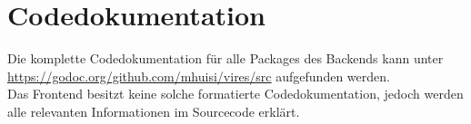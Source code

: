 \section{Codedokumentation}
Die komplette Codedokumentation für alle Packages des Backends kann unter \url{https://godoc.org/github.com/mhuisi/vires/src} aufgefunden werden. \\
Das Frontend besitzt keine solche formatierte Codedokumentation, jedoch werden alle relevanten Informationen im Sourcecode erklärt.